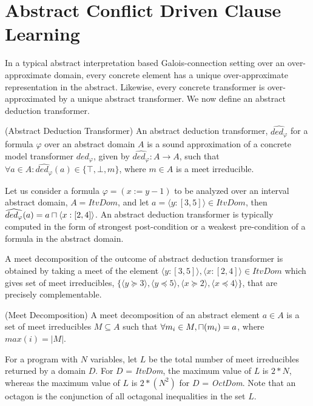 \section{Abstract Conflict Driven Clause Learning}
In a typical abstract interpretation based Galois-connection setting
over an over-approximate domain, every concrete element has a unique
over-approximate representation in the abstract.  Likewise, every
concrete transformer is over-approximated by a unique abstract
transformer.  We now define an abstract deduction transformer.

\begin{definition}{(Abstract Deduction Transformer)} An abstract deduction
transformer, $\widehat{ded_{\varphi}}$ for a formula $\varphi$ over an abstract 
domain $A$ is a sound approximation of a concrete model transformer
$ded_{\varphi}$, given by $\widehat{ded_{\varphi}} : A \rightarrow A$, such that 
$\forall a \in A: \widehat{ded_{\varphi}}(a) \in \{\top, \bot, m\}$, where 
$m \in A$ is a meet irreducible.   
\end{definition}

Let us consider a formula $\varphi = (x:=y-1)$ to be analyzed over 
an interval abstract domain, $A = ItvDom$, and let $a = \langle y:[3, 5]
\rangle \in ItvDom$, then $\widehat{ded_{\varphi}}(a) = a \sqcap \langle x:[2, 4]
\rangle$.  An abstract deduction transformer is typically computed in the form 
of strongest post-condition or a weakest pre-condition of a formula in the 
abstract domain.  

A meet decomposition of the outcome of abstract deduction transformer 
is obtained by taking a meet of the element $\langle y:[3, 5] \rangle, 
\langle x:[2, 4] \rangle \in ItvDom$ which gives set of meet irreducibles, 
$\{ \langle y \succeq 3 \rangle, \langle y \preceq 5 \rangle, 
\langle x \succeq 2 \rangle, \langle x \preceq 4 \rangle \}$, that are 
precisely complementable.

\begin{definition}{(Meet Decomposition)} A meet decomposition of an abstract
element $a \in A$ is a set of meet irreducibles $M \subseteq A$ such that 
$\forall m_i \in M, \sqcap(m_i) = a$, where $max(i) = |M|$.
\end{definition}
 
For a program with $N$ variables, let $L$ be the total number of 
meet irreducibles returned by a domain $D$.  For $D$ = {\em ItvDom}, the 
maximum value of $L$ is $2*N$, whereas the maximum value of $L$ is 
$2*(N^2)$ for $D$ = {\em OctDom}. Note that an octagon is the conjunction 
of all octagonal inequalities in the set $L$.


